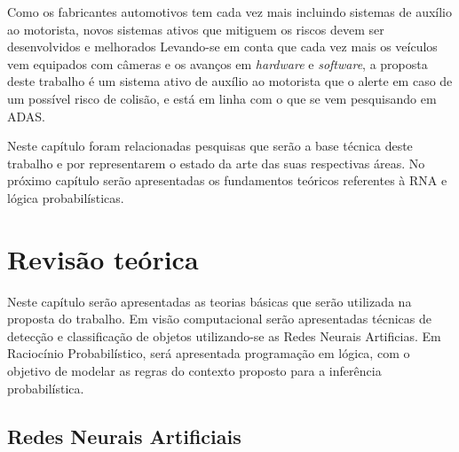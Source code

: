 \documentclass[
	12pt,				%
    oneside,			%
	a4paper,			%
	english,			%
	french,				%
	spanish,			%
	brazil,				%
	]{abntex2}
\begin{document}
Como os fabricantes automotivos tem cada vez mais incluindo sistemas de auxílio ao motorista, novos sistemas ativos que mitiguem os riscos devem ser desenvolvidos e melhorados Levando-se em conta que cada vez mais os veículos vem equipados com câmeras e os avanços em \textit{hardware} e \textit{software}, a proposta deste trabalho é um sistema ativo de auxílio ao motorista que o alerte em caso de um possível risco de colisão, e está em linha com o que se vem pesquisando em ADAS.

Neste capítulo foram relacionadas pesquisas que serão a base técnica deste trabalho e por representarem o estado da arte das suas respectivas áreas. No próximo capítulo serão apresentadas os fundamentos teóricos referentes à RNA e lógica probabilísticas.








\chapter{Revisão teórica}

Neste capítulo serão apresentadas as teorias básicas que serão utilizada na proposta do trabalho. Em visão computacional serão apresentadas técnicas de detecção e classificação de objetos utilizando-se as Redes Neurais Artificias. Em Raciocínio Probabilístico, será apresentada programação em lógica, com o objetivo de modelar as regras do contexto proposto para a inferência probabilística.

\section {Redes Neurais Artificiais}




\end{document}
